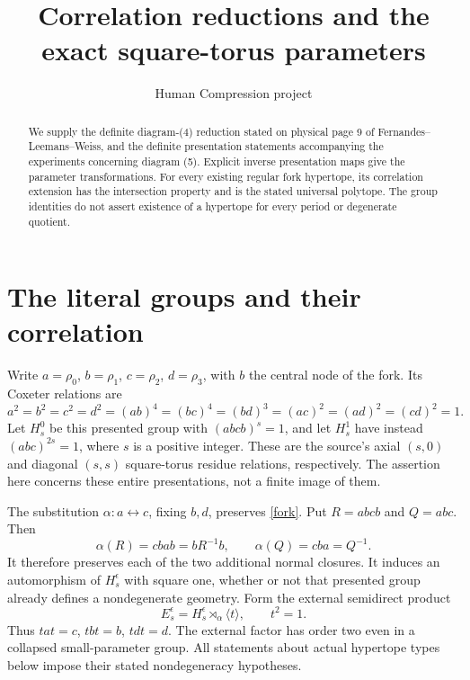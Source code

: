 \documentclass[11pt,a4paper]{article}
\title{Correlation reductions and the exact square-torus parameters}
\author{Human Compression project}\date{}
\newcommand{\gp}[1]{\langle #1\rangle}
\begin{document}
\maketitle
\begin{abstract}
We supply the definite diagram-(4) reduction stated on physical page 9
of Fernandes--Leemans--Weiss, and the definite presentation statements
accompanying the experiments concerning diagram (5). Explicit inverse
presentation maps give the parameter transformations. For every existing regular fork hypertope, its correlation
extension has the intersection property and is the stated universal
polytope. The group identities do not assert existence of a hypertope for
every period or degenerate quotient.
\end{abstract}

\section{The literal groups and their correlation}
Write $a=\rho _0$, $b=\rho _1$, $c=\rho _2$, $d=\rho _3$, with $b$ the
central node of the fork. Its Coxeter relations are
\begin{equation}\label{fork}
 a^2=b^2=c^2=d^2=(ab)^4=(bc)^4=(bd)^3
 =(ac)^2=(ad)^2=(cd)^2=1.
\end{equation}
Let $H_s^0$ be this presented group with $(abcb)^s=1$, and let $H_s^1$
have instead $(abc)^{2s}=1$, where $s$ is a positive integer. These are
the source's axial $(s,0)$ and diagonal $(s,s)$ square-torus residue
relations, respectively. The assertion here concerns these entire
presentations, not a finite image of them.

The substitution $\alpha:a\leftrightarrow c$, fixing $b,d$, preserves
\eqref{fork}. Put $R=abcb$ and $Q=abc$. Then
\[
 \alpha(R)=cbab=bR^{-1}b,\qquad \alpha(Q)=cba=Q^{-1}.
\]
It therefore preserves each of the two additional normal closures.
It induces an automorphism of $H_s^\epsilon$ with square one, whether
or not that presented group already defines a nondegenerate geometry.
Form the external semidirect product
\[
 E_s^\epsilon=H_s^\epsilon\rtimes_\alpha\gp{t},\qquad t^2=1.
\]
Thus $tat=c$, $tbt=b$, $tdt=d$. The external factor has order two even
in a collapsed small-parameter group. All statements about actual
hypertope types below impose their stated nondegeneracy hypotheses.
\end{document}
